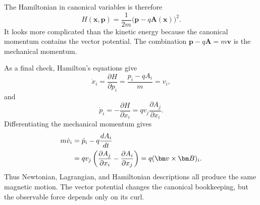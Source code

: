 The Hamiltonian in canonical variables is therefore
\begin{equation}
 \boxed{
 H(\bm x,\bm p)
 =\frac{1}{2m}\bigl(\bm p-q\bm A(\bm x)\bigr)^2.}
 \label{eq:l07-magnetic-Hamiltonian}
\end{equation}
It looks more complicated than the kinetic energy because the canonical
momentum contains the vector potential. The combination
\(\bm p-q\bm A=m\bm v\) is the mechanical momentum.

\begin{classroomqa}
\end{classroomqa}

As a final check, Hamilton's equations give
\begin{equation}
 \dot x_i=\frac{\partial H}{\partial p_i}
 =\frac{p_i-qA_i}{m}=v_i,
 \label{eq:l07-first-H-check}
\end{equation}
and
\begin{equation}
 \dot p_i=-\frac{\partial H}{\partial x_i}
 =qv_j\frac{\partial A_j}{\partial x_i}.
 \label{eq:l07-second-H-check}
\end{equation}
Differentiating the mechanical momentum gives
\begin{align}
 m\dot v_i
 &=\dot p_i-q\frac{dA_i}{dt}\notag\\
 &=qv_j\left(
   \frac{\partial A_j}{\partial x_i}
  -\frac{\partial A_i}{\partial x_j}
  \right)
 =q(\bm v\times\bm B)_i.
 \label{eq:l07-Hamiltonian-lorentz-check}
\end{align}
Thus Newtonian, Lagrangian, and Hamiltonian descriptions all produce the same
magnetic motion. The vector potential changes the canonical bookkeeping, but
the observable force depends only on its curl.
